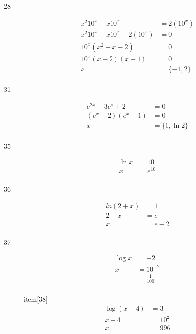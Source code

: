 \documentclass{exam}
\begin{document}
\begin{description}
      \item[28]
        \begin{align*}
          x^2 10^x - x 10^x           &= 2(10^x) \\
          x^2 10^x - x 10^x - 2(10^x) &= 0 \\
           10^x (x^2  - x  - 2)       &= 0 \\
           10^x (x - 2)(x + 1)        &= 0 \\
          x                           &= \boxed{ \{ -1, 2 \} } \\
        \end{align*}

      \item[31]
        \begin{align*}
          e^{2x} - 3e^x + 2  &= 0 \\
          (e^x - 2)(e^x - 1) &= 0 \\
          x                  &= \boxed{ \{ 0, \ln 2 \} } \\
        \end{align*}

      \item[35] 
        \begin{align*}
          \ln x &= 10 \\
          x     &= \boxed{e^{10}} \\
        \end{align*}

      \item[36] 
        \begin{align*}
          ln (2 + x) &= 1 \\
          2 + x      &= e \\
          x          &= \boxed{e - 2} \\
        \end{align*}

      \item[37] 
        \begin{align*}
          \log x &= -2 \\
          x      &= 10^{-2} \\
                 &= \boxed{\frac{1}{100}} \\
        \end{align*}

      item[38] 
        \begin{align*}
          \log (x - 4) &= 3 \\
          x - 4        &= 10^3 \\
          x            &= \boxed{996} \\
        \end{align*}


\end{description}
\end{document}
